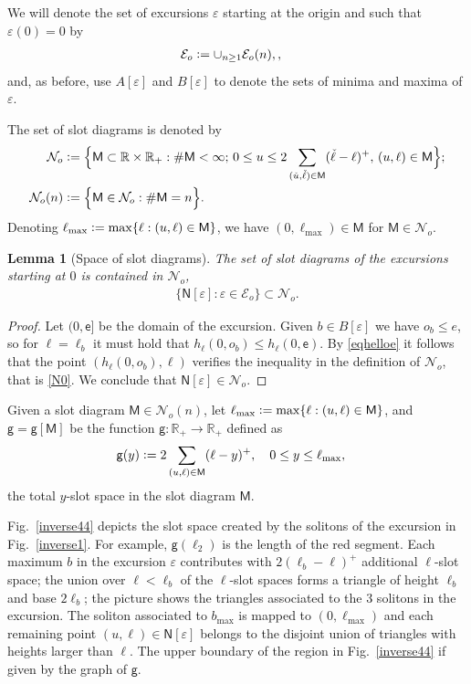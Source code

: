 \documentclass[12pt]{article}
\numberwithin{equation}{section}
\newtheorem{lemma}[theorem]{Lemma}
\newcommand{\R}{\mathbb R}
\newcommand{\RR}{\mathbb R}
\newcommand{\cE}{\mathcal E}
\newcommand{\cN}{\mathcal N}
\newcommand{\sM}{\mathsf{M}}
\newcommand{\sN}{\mathsf{N}}
\newcommand{\se}{{\mathsf{e}}}
\newcommand{\sg}{\mathsf{g}}
\newcommand{\ckl}{{\check \ell}}
\newcommand{\cku}{{\check u}}
\newcommand{\vep}{\varepsilon}
\newcommand{\eps}{\varepsilon}
\begin{document}
We will denote the set of excursions $\vep$ starting at the origin and such that $\vep(0)=0$ by
\begin{align}
 \cE_o&\vcentcolon = \cup_{n\ge1} \cE_o(n), \label{cEo}, 
\end{align}
and, as before, use $A[\vep]$ and $B[\vep]$ to denote the sets of minima and maxima of $\vep$.

The set of slot diagrams is denoted by
 \begin{align}
 \cN_o&\vcentcolon = \Bigl\{\sM\subset \RR\times \RR_+: \#\sM<\infty; \, %
   0\le u \le 2\sum_{(\cku, \ckl)\in\sM}(\ckl-\ell)^+, \, (u, \ell)\in\sM\Bigr\};\label{N0}\\
  \cN_o(n)&\vcentcolon = \Bigl\{\sM\in\cN_o: \#\sM=n\Bigr\}.\label{Nn2}
\end{align}
Denoting $\ell_{\max}\vcentcolon =\max\{\ell:(u, \ell)\in\sM\}$, we have $(0, \ell_{\max})\in\sM$ for $\sM\in\cN_o$.

\begin{lemma}[Space of slot diagrams]
 \label{ssd1}
 The set of slot diagrams of the excursions starting at $0$ is contained in $\cN_o$,
 \begin{align}
 \label{en1}
 \{\sN[\vep]:\vep\in\cE_o\}\subset \cN_o.
 \end{align}
\end{lemma}



\begin{proof}
Let $(0,\se]$ be the domain of the excursion.
Given $b\in B[\eps]$ we have $o_b\leq e$, so for $\ell=\ell_b$ it must hold that $h_\ell(0,o_{b})\leq h_\ell(0,\se)$.
By \eqref{eqhelloe} it follows that the point $(h_\ell(0,o_{b}),\ell)$ verifies the inequality in the definition of 
$\cN_o$, that is \eqref{N0}.
We conclude that $\sN[\vep]\in \cN_o$.
\end{proof}

Given a slot diagram $\sM\in \cN_o(n)$, let $\ell_{\max}\vcentcolon = \max \{\ell: (u,\ell)\in \sM\}$, and $\sg=\sg[\sM]$ be the function $\sg:\R_+\to\R_+$ defined as
\begin{align} 
\sg(y)&\vcentcolon = 2\sum_{(u, \ell)\in\sM} (\ell-y)^+, \quad 0\le y\le \ell_{\max},\label{sca7}
\end{align}
the total $y$-slot space in the slot diagram $\sM$. 

Fig.~\ref{inverse44} depicts the slot space created by the solitons of the excursion in Fig.~\ref{inverse1}.
For example, $\sg(\ell_2)$ is the length of the red segment.
Each maximum $b$ in the excursion $\vep$ contributes with $2(\ell_b-\ell)^+$ additional $\ell$-slot space; the union over $\ell<\ell_b$ of the $\ell$-slot spaces forms a triangle of height $\ell_b$ and base $2\ell_b$; the picture shows the triangles associated to the 3 solitons in the excursion. The soliton associated to $b_{\max}$ is mapped to $(0, \ell_{\max})$ and each remaining point $(u, \ell)\in\sN[\vep]$ belongs to the disjoint union of triangles with heights larger than $\ell$. The upper boundary of the region in Fig.~\ref{inverse44} if given by the graph of $\sg$.
\end{document}
